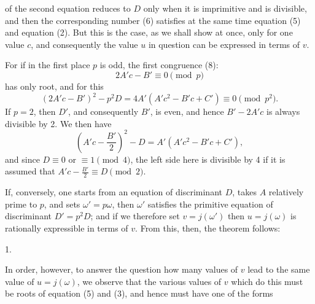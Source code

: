 of the second equation reduces to $D$ only when it is imprimitive and
is divisible, and then the corresponding number (6) satisfies at the same time equation (5) and equation (2). But this is the case, as we shall show at once, only for one value $c$, and consequently the value $u$ in question can be expressed  in terms of $v$.

For if in the first place $p$ is odd, the first congruence (8):
\[
2A'c - B' \equiv 0 \pmod{p}
\]
has only  root, and for this
\[
(2A'c - B')^2 - p^2D = 4A'(A'c^2 - B'c + C') \equiv 0 \pmod{p^2}.
\]
If $p = 2$, then $D'$, and consequently $B'$, is even, and hence $B' - 2A'c$ is always divisible by 2. We then have
\[
\left(A'c - \frac{B'}{2}\right)^2 - D = A'(A'c^2 - B'c + C'),
\]
and since $D \equiv 0$ or $\equiv 1 \pmod{4}$, the left side here is divisible by 4 if it is assumed that $A'c - \frac{B'}{2} \equiv D \pmod{2}$.

If, conversely, one starts from an equation
of discriminant $D$, takes $A$ relatively prime to $p$, and sets $\omega' = p\omega$, then $\omega'$ satisfies the primitive equation
of discriminant $D' = p^2D$; and if we therefore set $v = j(\omega')$
then $u = j(\omega)$ is rationally expressible in terms of $v$. From this, then, the theorem follows:

1. 

In order, however, to answer the question how many values of $v$ lead to the same value of $u = j(\omega)$, we observe that the various values of $v$ which do this must be roots of equation (5) and (3), and hence must have one of the forms

